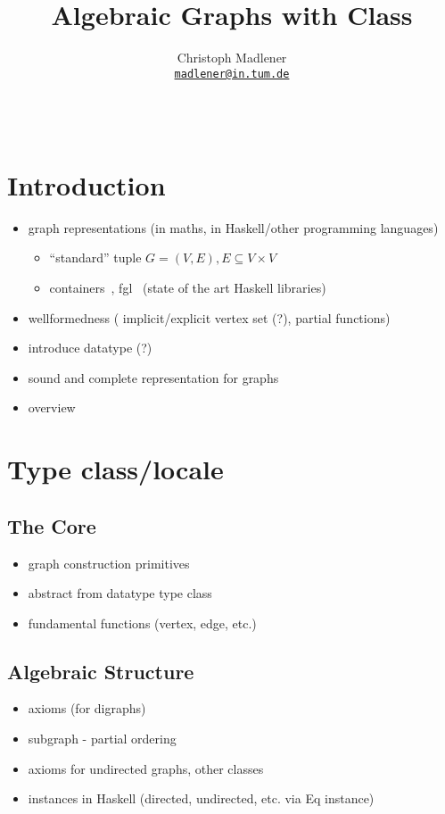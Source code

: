 \documentclass{article}
\title{Algebraic Graphs with Class}
\author{
  Christoph Madlener\\
  \texttt{\href{mailto:madlener@in.tum.de}{madlener@in.tum.de}}
}
\begin{document}
\maketitle
\begin{abstract}
  ~\cite{mokhov2017algebraic} 
\end{abstract}

\section{Introduction}
\begin{itemize}
\item graph representations (in maths, in Haskell/other programming languages)
  \begin{itemize}
  \item ``standard'' tuple $G=(V,E), E \subseteq V \times V$
  \item containers~\cite{king1995dfs}, fgl~\cite{erwig2001inductive} (state of the art Haskell libraries)
  \end{itemize}
\item wellformedness (\textrightarrow{} implicit/explicit vertex set (?),
  partial functions)
\item introduce datatype (?)
\item sound and complete representation for graphs
\item overview
\end{itemize}

\section{Type class/locale}
\subsection{The Core}
\begin{itemize}
\item graph construction primitives
\item abstract from datatype \textrightarrow{} type class
\item fundamental functions (vertex, edge, etc.)
\end{itemize}
\subsection{Algebraic Structure}
\begin{itemize}
\item axioms (for digraphs)
\item subgraph - partial ordering
\item axioms for undirected graphs, other classes
\item instances in Haskell (directed, undirected, etc. via Eq instance)
\end{itemize}
\end{document}
